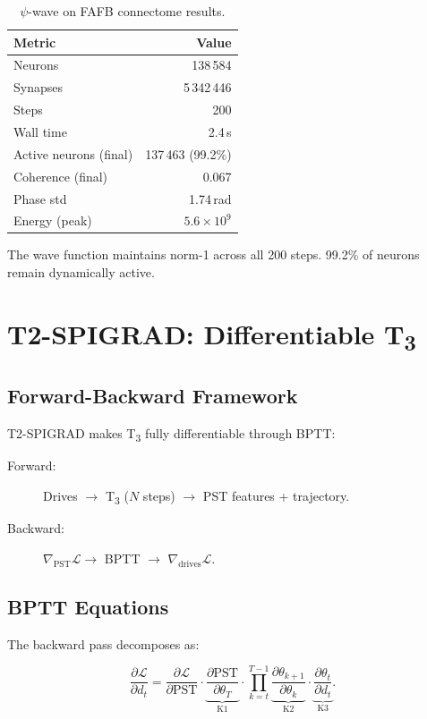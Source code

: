\documentclass[twocolumn,10pt]{article}
\newcommand{\Tthree}{T\textsubscript{3}}
\newcommand{\psiwave}{$\psi$-wave}
\newcommand{\cL}{\mathcal{L}}
\begin{document}
\begin{table}[h]
\centering
\caption{\psiwave{} on FAFB connectome results.}
\begin{tabular}{lr}
\toprule
Metric & Value \\
\midrule
Neurons & 138\,584 \\
Synapses & 5\,342\,446 \\
Steps & 200 \\
Wall time & 2.4\,s \\
Active neurons (final) & 137\,463 (99.2\%) \\
Coherence (final) & 0.067 \\
Phase std & 1.74\,rad \\
Energy (peak) & $5.6\times10^9$ \\
\bottomrule
\end{tabular}
\end{table}

The wave function maintains norm-1 across all 200 steps. 99.2\% of neurons remain dynamically active.

\section{T2-SPIGRAD: Differentiable \Tthree{}}

\subsection{Forward-Backward Framework}

T2-SPIGRAD makes \Tthree{} fully differentiable through BPTT:
\begin{description}
  \item[Forward:] Drives $\rightarrow$ \Tthree{} ($N$ steps) $\rightarrow$ PST features + trajectory.
  \item[Backward:] $\nabla_{\text{PST}}\cL \rightarrow$ BPTT $\rightarrow$ $\nabla_{\text{drives}}\cL$.
\end{description}

\subsection{BPTT Equations}

The backward pass decomposes as:

\begin{equation}
\frac{\partial\cL}{\partial d_t} = \frac{\partial\cL}{\partial\text{PST}}\cdot
\underbrace{\frac{\partial\text{PST}}{\partial\theta_T}}_{\text{K1}}\cdot
\prod_{k=t}^{T-1}\underbrace{\frac{\partial\theta_{k+1}}{\partial\theta_k}}_{\text{K2}}\cdot
\underbrace{\frac{\partial\theta_t}{\partial d_t}}_{\text{K3}}.
\end{equation}
\end{document}
